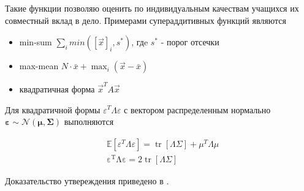 Такие функции позволяю оценить по индивидуальным качествам учащихся их совместный вклад в дело. Примерами супераддитивных функций являются \begin{itemize}
    \item min-sum $\sum_{i} min([\vec{x}]_i,s^*)$, гдe $s^*$ - порог отсечки
    \item max-mean $N \cdot \bar{x} + \max_i(\vec{x} - \bar{x})$
    \item квадратичная форма $\vec{x}^T A \vec{x}$
\end{itemize}


Для квадратичной формы $\varepsilon^T \Lambda \varepsilon$ с
вектором распределенным нормально $\mathbf{\varepsilon} \sim \mathcal{N}(\mathbf{\mu},\mathbf{\Sigma})$ выполняются

\begin{equation}
    \begin{aligned}
        & \mathbb{E}[\varepsilon^T \Lambda \varepsilon] = \operatorname{tr}[\Lambda \Sigma] + \mu^T \Lambda \mu \\ 
        & \operatorname{\varepsilon^T \Lambda \varepsilon} = 2  \operatorname{tr}[\Lambda \Sigma] 
    \end{aligned}
\end{equation}

Доказательство утвереждения приведено в \cite{mathai1992quadratic}.
